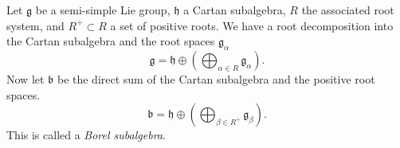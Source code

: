 \documentclass[12pt]{article}
\newcommand{\mf}{\mathfrak}
\begin{document}
Let $\mf{g}$ be a semi-simple Lie group, $\mf{h}$ a Cartan subalgebra, $R$ the associated root system, and $R^+\subset R$ a set of positive roots.  We have a root decomposition into the Cartan subalgebra and the root spaces $\mf{g}_\alpha$
$$\mf{g}=\mf{h}\oplus\left(\bigoplus_{\alpha\in R}\mf{g}_\alpha\right).$$
Now let $\mf{b}$ be the direct sum of the Cartan subalgebra and the positive root spaces.
$$\mf{b}=\mf{h}\oplus\left(\bigoplus_{\beta\in R^+}\mf{g}_\beta\right).$$
This is called a {\em Borel subalgebra}.
\end{document}
